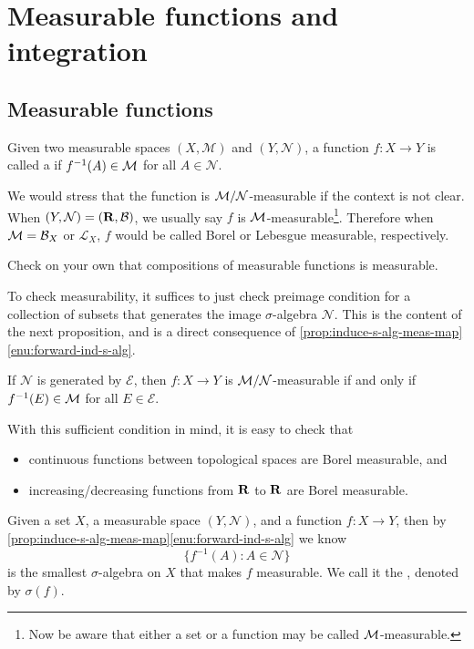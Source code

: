 \chapter{Measurable functions and integration} \label{chap:meas-func-int}
\section{Measurable functions}\label{sec:measurable-functions}

\begin{defn}
    Given two measurable spaces $(X,\mathcal{M})$ and $(Y,\mathcal{N})$, a function $f\colon X \to Y$ is called a  if $f^{-1}(A) \in \mathcal{M}$ for all $A \in \mathcal{N}$.
    
    We would stress that the function is $\mathcal{M}/\mathcal{N}$-measurable if the context is not clear. When $(Y,\mathcal{N}) = (\mathbf{R},\mathcal{B})$, we usually say $f$ is $\mathcal{M}$-measurable\footnote{Now be aware that either a set or a function may be called $\mathcal{M}$-measurable.}. Therefore when $\mathcal{M}=\mathcal{B}_X$ or $\mathcal{L}_X$, $f$ would be called Borel or Lebesgue measurable, respectively.
\end{defn}

Check on your own that compositions of measurable functions is measurable.

To check measurability, it suffices to just check preimage condition for a collection of subsets that generates the image $\sigma$-algebra $\mathcal{N}$. This is the content of the next proposition, and is a direct consequence of \cref{prop:induce-s-alg-meas-map}\ref{enu:forward-ind-s-alg}.
\begin{prop}\label{prop:measurability-generate}
    If $\mathcal{N}$ is generated by $\mathcal{E}$, then $f\colon X \to Y$ is $\mathcal{M}/\mathcal{N}$-measurable if and only if $f^{-1}(E) \in \mathcal{M}$ for all $E \in \mathcal{E}$.    
\end{prop}

With this sufficient condition in mind, it is easy to check that \begin{itemize}
    \item continuous functions between topological spaces are Borel measurable, and
    \item increasing/decreasing functions from $\mathbf{R}$ to $\mathbf{R}$ are Borel measurable.
\end{itemize}

Given a set $X$, a measurable space $(Y,\mathcal{N})$, and a function $f\colon X \to Y$, then by \cref{prop:induce-s-alg-meas-map}\ref{enu:forward-ind-s-alg} we know \[
    \{f^{-1}(A):A\in \mathcal{N}\}
\] is the smallest $\sigma$-algebra on $X$ that makes $f$ measurable. We call it the , denoted by $\sigma(f)$.


